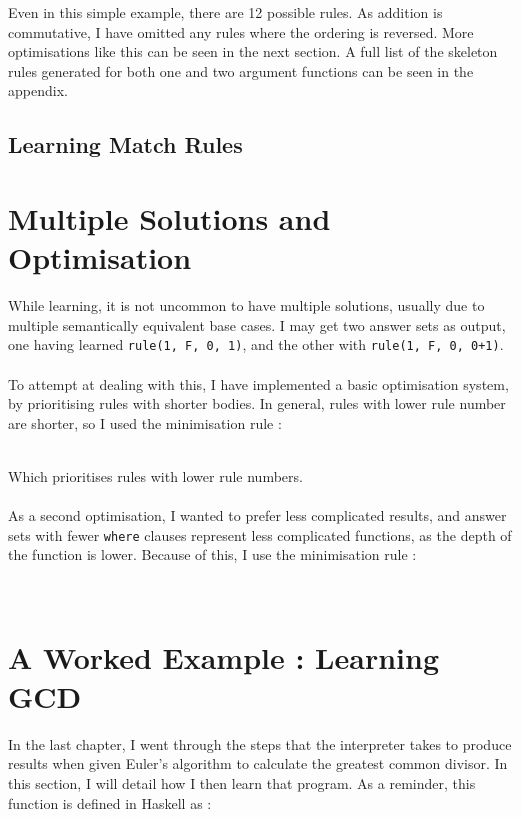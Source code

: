 Even in this simple example, there are 12 possible rules. As addition is commutative, I have omitted any rules where the ordering is reversed. More optimisations like this can be seen in the next section.
A full list of the skeleton rules generated for both one and two argument functions can be seen in the appendix.

\subsection{Learning Match Rules}


\section{Multiple Solutions and Optimisation}
While learning, it is not uncommon to have multiple solutions, usually due to multiple semantically equivalent base cases. I may get two answer sets as output, one having learned \lstinline{rule(1, F, 0, 1)}, and the other with \lstinline{rule(1, F, 0, 0+1)}. \\ \\
To attempt at dealing with this, I have implemented a basic optimisation system, by prioritising rules with shorter bodies. In general, rules with lower rule number are shorter, so I used the minimisation rule :


\mbox{}\\
Which prioritises rules with lower rule numbers.\\ \\
As a second optimisation, I wanted to prefer less complicated results, and answer sets with fewer \lstinline{where} clauses represent less complicated functions, as the depth of the function is lower. Because of this, I use the minimisation rule : %


\mbox{}\\

\section{A Worked Example : Learning GCD}
In the last chapter, I went through the steps that the interpreter takes to produce results when given Euler's algorithm to calculate the greatest common divisor. In this section, I will detail how I then learn that program. As a reminder, this function is defined in Haskell as :

